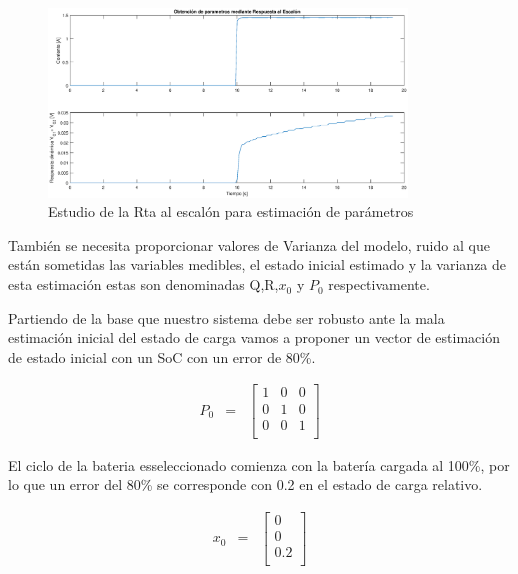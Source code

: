 \documentclass[10pt,a4paper]{article}
\begin{document}
\begin{figure}[h!]
    \begin{center}
	\includegraphics[width=0.85\textwidth]{rta_escalon.eps}
	\caption{Estudio de la Rta al escalón para estimación de parámetros}
	\label{rta_escalon}
    \end{center}
\end{figure}
\FloatBarrier

También se necesita proporcionar valores de Varianza del modelo, ruido al que
están sometidas las variables medibles, el estado inicial estimado y la varianza
de esta estimación estas son denominadas Q,R,$x_0$ y $P_0$ respectivamente.

\noindent Partiendo de la base que nuestro sistema debe ser robusto ante la mala
estimación inicial del estado de carga vamos a proponer un vector de estimación
de estado inicial con un SoC con un error de 80\%.

\begin{equation}
    \begin{array}{llll}
	P_0 & = & \begin{bmatrix}
	    1 & 0 & 0 \\
	    0 & 1 & 0 \\
	    0 & 0 & 1 \\
	\end{bmatrix} 
    \end{array} \nonumber
\end{equation}

\noindent El ciclo de la bateria esseleccionado comienza con la batería cargada
al 100\%, por lo que un error del 80\% se corresponde con 0.2 en el estado de
carga relativo.

\begin{equation}
    \begin{array}{llll}
	x_0 & = & \begin{bmatrix}
	    0 \\
	    0 \\
	    0.2 \\
	\end{bmatrix} 
    \end{array} \nonumber
\end{equation}
\end{document}
